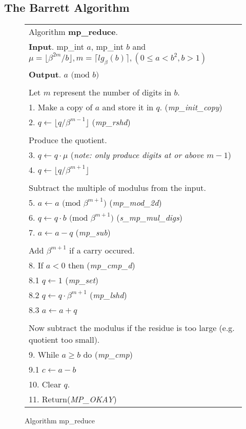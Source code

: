 \documentclass[b5paper]{book}
\begin{document}
\subsection{The Barrett Algorithm}
\newpage\begin{figure}[!here]
\begin{small}
\begin{center}
\begin{tabular}{l}
\hline Algorithm \textbf{mp\_reduce}. \\
\textbf{Input}.   mp\_int $a$, mp\_int $b$ and $\mu = \lfloor \beta^{2m}/b \rfloor, m = \lceil lg_{\beta}(b) \rceil, (0 \le a < b^2, b > 1)$ \\
\textbf{Output}.  $a \mbox{ (mod }b\mbox{)}$ \\
\hline \\
Let $m$ represent the number of digits in $b$.  \\
1.  Make a copy of $a$ and store it in $q$.  (\textit{mp\_init\_copy}) \\
2.  $q \leftarrow \lfloor q / \beta^{m - 1} \rfloor$ (\textit{mp\_rshd}) \\
\\
Produce the quotient. \\
3.  $q \leftarrow q \cdot \mu$  (\textit{note: only produce digits at or above $m-1$}) \\
4.  $q \leftarrow \lfloor q / \beta^{m + 1} \rfloor$ \\
\\
Subtract the multiple of modulus from the input. \\
5.  $a \leftarrow a \mbox{ (mod }\beta^{m+1}\mbox{)}$ (\textit{mp\_mod\_2d}) \\
6.  $q \leftarrow q \cdot b \mbox{ (mod }\beta^{m+1}\mbox{)}$ (\textit{s\_mp\_mul\_digs}) \\
7.  $a \leftarrow a - q$ (\textit{mp\_sub}) \\
\\
Add $\beta^{m+1}$ if a carry occured. \\
8.  If $a < 0$ then (\textit{mp\_cmp\_d}) \\
\hspace{3mm}8.1  $q \leftarrow 1$ (\textit{mp\_set}) \\
\hspace{3mm}8.2  $q \leftarrow q \cdot \beta^{m+1}$ (\textit{mp\_lshd}) \\
\hspace{3mm}8.3  $a \leftarrow a + q$ \\
\\
Now subtract the modulus if the residue is too large (e.g. quotient too small). \\
9.  While $a \ge b$ do (\textit{mp\_cmp}) \\
\hspace{3mm}9.1  $c \leftarrow a - b$ \\
10.  Clear $q$. \\
11.  Return(\textit{MP\_OKAY}) \\
\hline
\end{tabular}
\end{center}
\end{small}
\caption{Algorithm mp\_reduce}
\end{figure}
\end{document}
